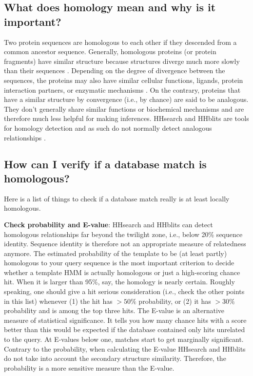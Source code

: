 \documentclass[11pt,a4paper]{article}
\begin{document}
\subsection{What does homology mean and why is it important?}
Two protein sequences are homologous to each other if they descended from a common ancestor sequence. Generally, homologous proteins (or protein fragments) have similar structure because structures diverge much more slowly than their sequences \cite{Chothia:1986}. Depending on the degree of divergence between the sequences, the proteins may also have similar cellular functions, ligands, protein interaction partners, or enzymatic mechanisms \cite{Todd:2001}. On the contrary, proteins that have a similar structure by convergence (i.e., by chance) are said to be analogous. They don't generally share similar functions or biochemical mechanisms and are therefore much less helpful for making inferences. HHsearch and HHblits are tools for homology detection and as such do not normally detect analogous relationships \cite{Alva:2010,Remmert:2010}.


\subsection{How can I verify if a database match is homologous?}
Here is a list of things to check if a database match really is at least locally homologous.
 
{\bf Check probability and E-value}:
HHsearch and HHblits can detect homologous relationships far beyond the twilight zone, i.e., below 20\% sequence identity. Sequence identity is therefore not an appropriate measure of relatedness anymore. The estimated probability of the template to be (at least partly) homologous to your query sequence is the most important criterion to decide whether a template HMM is actually homologous or just a high-scoring chance hit. When it is larger than 95\%, say, the homology is nearly certain. Roughly speaking, one should give a hit serious consideration (i.e., check the other points in this list) whenever (1) the hit has $>50\%$ probability, or (2) it has $>30\%$ probability and is among the top three hits. The E-value is an alternative measure of statistical significance. It tells you how many chance hits with a score better than this would be expected if the database contained only hits unrelated to the query. At E-values below one, matches start to get marginally significant. Contrary to the probability, when calculating the E-value HHsearch and HHblits do not take into account the secondary structure similarity. Therefore, the probability is a more sensitive measure than the E-value.
\end{document}

